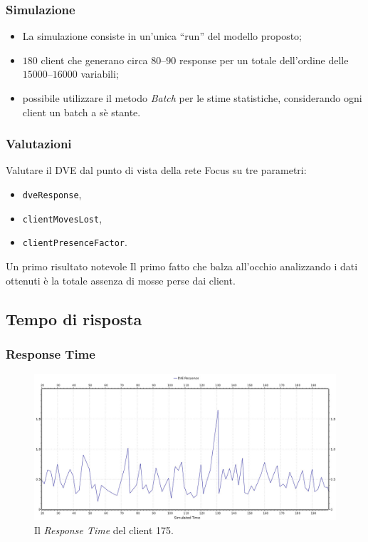 

\begin{frame}
\frametitle{Simulazione}
\begin{itemize}[<+->]
\item
La simulazione consiste in un'unica ``run'' del modello proposto;
\item
$180$ client che generano circa $80$--$90$ response per un totale dell'ordine delle
$15000$--$16000$ variabili;
\item
possibile utilizzare il metodo \emph{Batch}
per le stime statistiche, considerando ogni client un batch a sè stante.
\end{itemize}
\end{frame}

\begin{frame}
\frametitle{Valutazioni}
\begin{block}{Valutare il DVE dal punto di vista della rete}
Focus su tre parametri:
\begin{itemize}%
\item
\texttt{dveResponse},
\item
\texttt{clientMovesLost},
\item
\texttt{clientPresenceFactor}.
\end{itemize}
\end{block}
\pause
\vfill
\begin{exampleblock}{Un primo risultato notevole}
Il primo fatto che balza all'occhio analizzando i dati ottenuti è la totale
\alert{assenza di mosse perse} dai client.
\end{exampleblock}
\end{frame}

\subsection*{Tempo di risposta}

\begin{frame}
\frametitle{Response Time}
\begin{figure}
\begin{center}
\includegraphics[scale=0.34]{response.jpeg}
\end{center}
\caption{Il \emph{Response Time} del client 175.}
\label{response}
\end{figure}
\end{frame}


